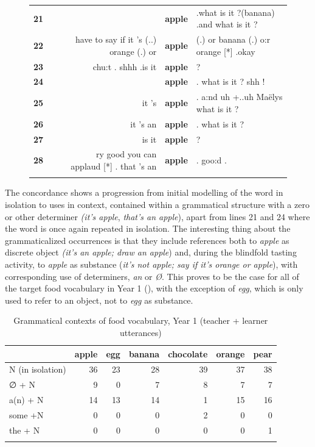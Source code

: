 \documentclass[output=paper,colorlinks,citecolor=brown,modfonts,nonflat]{../langscibook}
\begin{document}
\begin{figure}
{\begin{tabular}{l@{}l@{}lr@{~}l@{~}l}
 \textbf{21} &  & &  & \textbf{apple} & .what is it ?(banana) .and what is it ?\\
 \textbf{22} &  & &  have to say if it 's (..) orange (.) or & \textbf{apple} & (.) or banana (.) o:r orange [*] .okay \\
 \textbf{23} &  & &  chu:t . shhh .is it & \textbf{apple} & ?\\
 \textbf{24} &  & &  & \textbf{apple} & . what is it ? shh !\\
 \textbf{25} &  & &  it 's & \textbf{apple} & . a:nd uh +..uh Maëlys what is it ? \\
 \textbf{26} &  & &  it 's an & \textbf{apple} & . what is it ? \\
 \textbf{27} &  & &  is it & \textbf{apple} & ? \\
 \textbf{28} &  & &  ry good you can applaud [*] . that 's an & \textbf{apple} & . goo:d . \\
\lspbottomrule
\end{tabular}
}
\end{figure}

The concordance shows a progression from initial modelling of the word in isolation to uses in context, contained within a grammatical structure with a zero or other determiner \textit{(it’s apple}, \textit{that’s an apple}), apart from lines 21 and 24 where the word is once again repeated in isolation. The interesting thing about the grammaticalized occurrences is that they include references both to \textit{apple} as discrete object \textit{(it’s an apple; draw an apple}) and, during the blindfold tasting activity, to \textit{apple} as substance (\textit{it’s not apple; say if it’s orange or apple}), with corresponding use of determiners, \textit{an} or \textit{Ø}. This proves to be the case for all of the target food vocabulary in Year 1 (), with the exception of \textit{egg}, which is only used to refer to an object, not to \textit{egg} as substance.

\begin{table}
\caption{\label{tab:hilton:4} Grammatical contexts of food vocabulary, Year 1 (teacher + learner utterances)}

\begin{tabular}{lrrrrrr}
\lsptoprule
&  {apple} &  {egg} &  {banana} &  {chocolate} &  {orange} &  {pear}\\
\midrule
N (in isolation) & 36 & 23 & 28 & 39 & 37 & 38\\
∅ + N & 9 & 0 & 7 & 8 & 7 & 7\\
a(n) + N & 14 & 13 & 14 & 1 & 15 & 16\\
some +N & 0 & 0 & 0 & 2 & 0 & 0\\
the + N & 0 & 0 & 0 & 0 & 0 & 1\\
\lspbottomrule
\end{tabular}
\end{table}
\end{document}
